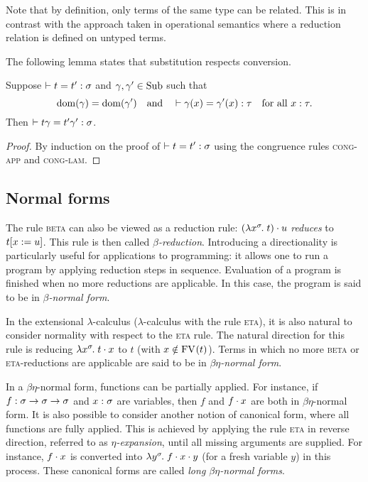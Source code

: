 Note that by definition, only terms of the same type can be related. This is in contrast with the approach taken in operational semantics where a reduction relation is defined on untyped terms.

The following lemma states that substitution respects conversion.

\begin{lem} \label{lem:sub-conv}
Suppose $\vdash t = t' : \sigma$ and $\gamma, \gamma' \in \mathrm{Sub}$ such that
\[ \mathrm{dom}(\gamma) = \mathrm{dom}(\gamma') \quad\text{and}\quad
    \vdash \gamma(x) = \gamma'(x) : \tau \quad \text{for all } x : \tau. \]
Then $\vdash t \gamma = t' \gamma' : \sigma$.
\begin{proof}
By induction on the proof of $\vdash t = t' : \sigma$ using the congruence rules \textsc{cong-app} and \textsc{cong-lam}.
\end{proof}
\end{lem}

\subsection{Normal forms}

The rule \textsc{beta} can also be viewed as a reduction rule: $(\lambda x^{\sigma}\hspace{-1pt}.\;t) \cdot u$ \textit{reduces} to $t [x := u]$. This rule is then called \textit{$\beta$-reduction}. Introducing a directionality is particularly useful for applications to programming: it allows one to run a program by applying reduction steps in sequence. Evaluation of a program is finished when no more reductions are applicable. In this case, the program is said to be in \textit{$\beta$-normal form}.

In the extensional $\lambda$-calculus ($\lambda$-calculus with the rule \textsc{eta}), it is also natural to consider normality with respect to the \textsc{eta} rule. The natural direction for this rule is reducing $\lambda x^{\sigma}\hspace{-1pt}.\;t \cdot x$ to $t$ (with $x \notin \mathrm{FV}_{}(t)$). Terms in which no more \textsc{beta} or \textsc{eta}-reductions are applicable are said to be in \textit{$\beta\eta$-normal form}.

In a $\beta\eta$-normal form, functions can be partially applied. For instance, if $f : \sigma \to \sigma \to \sigma$ and $x : \sigma$ are variables, then $f$ and $f \cdot x$ are both in $\beta\eta$-normal form. It is also possible to consider another notion of canonical form, where all functions are fully applied. This is achieved by applying the rule \textsc{eta} in reverse direction, referred to as \textit{$\eta$-expansion}, until all missing arguments are supplied. For instance, $f \cdot x$ is converted into $\lambda y^{\sigma}\hspace{-1pt}.\;f \cdot x \cdot y$ (for a fresh variable $y$) in this process. These canonical forms are called \textit{long $\beta\eta$-normal forms}.

